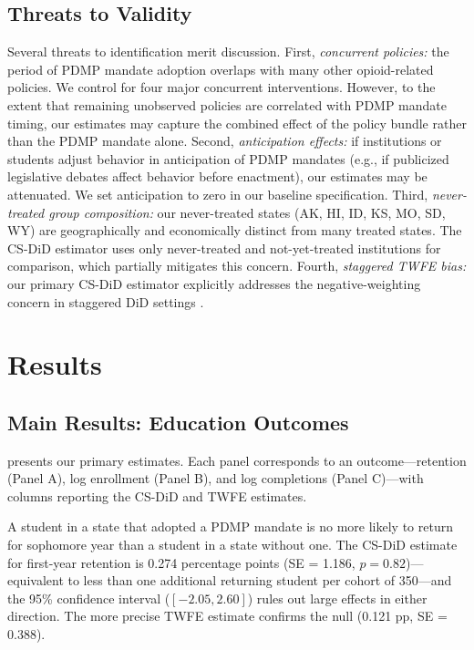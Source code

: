 \documentclass[12pt]{article}
\begin{document}
\subsection{Threats to Validity}

Several threats to identification merit discussion. First, \textit{concurrent policies:} the period of PDMP mandate adoption overlaps with many other opioid-related policies. We control for four major concurrent interventions. However, to the extent that remaining unobserved policies are correlated with PDMP mandate timing, our estimates may capture the combined effect of the policy bundle rather than the PDMP mandate alone. Second, \textit{anticipation effects:} if institutions or students adjust behavior in anticipation of PDMP mandates (e.g., if publicized legislative debates affect behavior before enactment), our estimates may be attenuated. We set anticipation to zero in our baseline specification. Third, \textit{never-treated group composition:} our never-treated states (AK, HI, ID, KS, MO, SD, WY) are geographically and economically distinct from many treated states. The CS-DiD estimator uses only never-treated and not-yet-treated institutions for comparison, which partially mitigates this concern. Fourth, \textit{staggered TWFE bias:} our primary CS-DiD estimator explicitly addresses the negative-weighting concern in staggered DiD settings \citep{goodman2017difference}.


\section{Results}

\subsection{Main Results: Education Outcomes}

 presents our primary estimates. Each panel corresponds to an outcome---retention (Panel A), log enrollment (Panel B), and log completions (Panel C)---with columns reporting the CS-DiD and TWFE estimates.



A student in a state that adopted a PDMP mandate is no more likely to return for sophomore year than a student in a state without one. The CS-DiD estimate for first-year retention is 0.274 percentage points (SE = 1.186, $p = 0.82$)---equivalent to less than one additional returning student per cohort of 350---and the 95\% confidence interval ($[-2.05, 2.60]$) rules out large effects in either direction. The more precise TWFE estimate confirms the null (0.121 pp, SE = 0.388).
\end{document}
